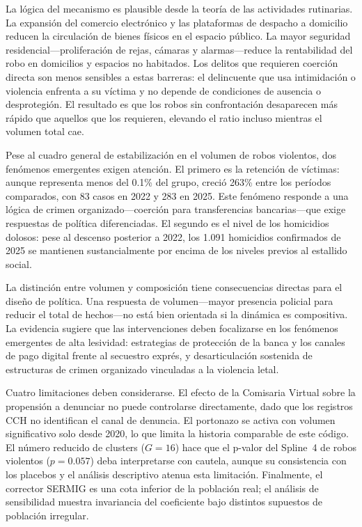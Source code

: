 \documentclass[12pt,a4paper]{article}
\begin{document}
La l\'ogica del mecanismo es plausible desde la teor\'ia de las actividades rutinarias.
La expansi\'on del comercio electr\'onico y las plataformas de despacho a domicilio
reducen la circulaci\'on de bienes f\'isicos en el espacio p\'ublico. La mayor seguridad
residencial---proliferaci\'on de rejas, c\'amaras y alarmas---reduce la rentabilidad del
robo en domicilios y espacios no habitados. Los delitos que requieren coerci\'on directa
son menos sensibles a estas barreras: el delincuente que usa intimidaci\'on o violencia
enfrenta a su v\'ictima y no depende de condiciones de ausencia o desprotegi\'on. El
resultado es que los robos sin confrontaci\'on desaparecen m\'as r\'apido que aquellos
que los requieren, elevando el ratio incluso mientras el volumen total cae.

Pese al cuadro general de estabilizaci\'on en el volumen de robos violentos, dos
fen\'omenos emergentes exigen atenci\'on. El primero es la retenci\'on de
v\'ictimas: aunque representa menos del 0.1\% del grupo, creci\'o 263\% entre los
per\'iodos comparados, con 83 casos en 2022 y 283 en 2025. Este fen\'omeno responde a
una l\'ogica de crimen organizado---coerci\'on para transferencias bancarias---que
exige respuestas de pol\'itica diferenciadas. El segundo es el nivel de los homicidios
dolosos: pese al descenso posterior a 2022, los 1.091 homicidios confirmados de 2025
se mantienen sustancialmente por encima de los niveles previos al estallido social.

La distinci\'on entre volumen y composici\'on tiene consecuencias directas para el
dise\~no de pol\'itica. Una respuesta de volumen---mayor presencia policial para reducir
el total de hechos---no est\'a bien orientada si la din\'amica es compositiva. La
evidencia sugiere que las intervenciones deben focalizarse en los fen\'omenos emergentes
de alta lesividad: estrategias de protecci\'on de la banca y los canales de pago digital
frente al secuestro expr\'es, y desarticulaci\'on sostenida de estructuras de crimen
organizado vinculadas a la violencia letal.

Cuatro limitaciones deben considerarse. El efecto de la Comisaria Virtual sobre la
propensi\'on a denunciar no puede controlarse directamente, dado que los registros CCH
no identifican el canal de denuncia. El portonazo se activa con volumen significativo
solo desde 2020, lo que limita la historia comparable de este c\'odigo. El n\'umero
reducido de clusters ($G=16$) hace que el p-valor del Spline~4 de robos violentos
($p=0.057$) deba interpretarse con cautela, aunque su consistencia con los placebos
y el an\'alisis descriptivo atenua esta limitaci\'on. Finalmente, el corrector SERMIG
es una cota inferior de la poblaci\'on real; el an\'alisis de sensibilidad muestra
invariancia del coeficiente bajo distintos supuestos de poblaci\'on irregular.
\end{document}
